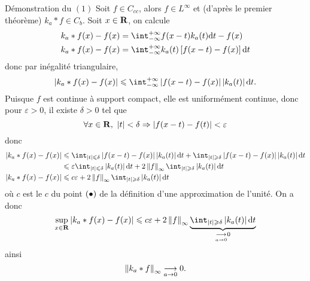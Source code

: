 \documentclass[a4paper,11pt, twoside]{article}
\begin{document}
\begin{ProofC}{Démonstration du $(\mathit 1)$}
  Soit $f\in C_{cc}$, alors $f\in L^\infty$ et (d'après le premier théorème) $k_a*f\in C_b$. Soit $x\in\mathbf R$, on calcule
  \begin{align*}
    k_a*f(x)-f(x)&=\intr f(x-t)k_a(t)\dt-f(x)\\
    k_a*f(x)-f(x)&=\intr k_a(t)\left[f(x-t)-f(x)\right]\dt
  \end{align*}
  donc par inégalité triangulaire,
  $$\abs{k_a*f(x)-f(x)}\leqslant\intr\abs{f(x-t)-f(x)}\abs{k_a(t)}\dt.$$
  Puisque $f$ est continue à support compact, elle est uniformément continue, donc pour $\varepsilon>0$, il existe $\delta>0$ tel que 
  $$\forall x\in\mathbf R,\ \left| t\right|<\delta\Rightarrow\left| f(x-t)-f(t)\right|<\varepsilon$$
  donc
  \begin{align*}
    \abs{k_a*f(x)-f(x)}&\leqslant\int_{\abs t\leqslant \delta}\abs{f(x-t)-f(x)}\abs{k_a(t)}\dt+\int_{\abs t\geqslant \delta}\abs{f(x-t)-f(x)}\abs{k_a(t)}\dt\\
    &\leqslant \varepsilon\int_{\abs t\leqslant \delta}\abs{k_a(t)}\dt+2\norm{f}_\infty\int_{\abs t\geqslant\delta}\abs{k_a(t)}\dt\\
    \abs{k_a*f(x)-f(x)}&\leqslant c\varepsilon+2\norm{f}_\infty\int_{\abs t\geqslant\delta}\abs{k_a(t)}\dt\\
  \end{align*}
  où $c$ est le $c$ du point $(\bullet)$ de la définition d'une approximation de l'unité. On a donc
  $$\underset{x\in\R}{\mathrm{sup}}\abs{k_a*f(x)-f(x)}\leqslant c\varepsilon +2\norm{f}_\infty\underbrace{\int_{\abs t\geqslant\delta}\abs{k_a(t)}\dt}_{\underset{a\to 0}{\longrightarrow}0}$$
  ainsi
  $$\left\lVert k_a*f\right\rVert_{\infty}\underset{a\to 0}{\longrightarrow}0.$$
\end{ProofC}
\end{document}
